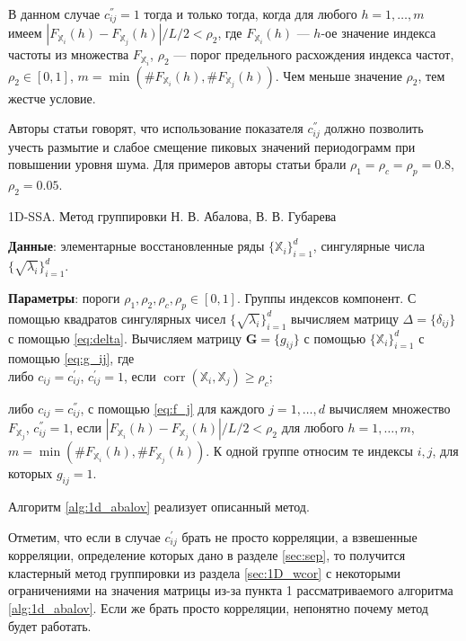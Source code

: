 \documentclass[specialist,
               substylefile = spbu.rtx,
               subf,href,colorlinks=true, 12pt]{disser}
\def\corr{\mathop{\mathrm{corr}}}
\begin{document}
В данном случае $c^{''}_{ij}=1$ тогда и только тогда, когда для любого $h=1,\ldots,m$ имеем $|F_{\mathbb{X}_i}(h) - F_{\mathbb{X}_j}(h)|/ L/2 < \rho_2$, где $F_{\mathbb{X}_i}(h)$ --- $h$-ое значение индекса частоты из множества $F_{\mathbb{X}_i}$, $\rho_2$ --- порог предельного расхождения индекса частот,  $\rho_2 \in [0,1]$, $m = \min\left(\#F_{\mathbb{X}_i}(h), \#F_{\mathbb{X}_j}(h) \right)$. Чем меньше значение $\rho_2$, тем жестче условие.

Авторы статьи говорят, что использование показателя $c^{''}_{ij}$ должно позволить
учесть размытие и слабое смещение пиковых значений периодограмм при повышении уровня шума.
Для примеров авторы статьи брали $\rho_1 =\rho_c =\rho_p = 0.8$, $\rho_2 = 0.05$.

\begin{algorithm}[!hhh]
\caption{1D-SSA. Метод группировки Н. В. Абалова, В. В. Губарева}
\label{alg:1d_abalov}
\begin{algorithmic}[1]
\REQUIRE 
\item \textbf{Данные}: элементарные восстановленные ряды $\{\mathbb{X}_i\}_{i=1}^{d}$, сингулярные числа $\{\sqrt{\lambda_i}\}_{i=1}^{d}$.
\item \textbf{Параметры}: пороги $\rho_1, \rho_2, \rho_c, \rho_p  \in [0,1]$.
\ENSURE Группы индексов компонент.
\STATE  С помощью квадратов сингулярных чисел $\{\sqrt{\lambda_i}\}_{i=1}^{d}$ вычисляем матрицу $\Delta = \{\delta_{ij}\}$ с помощью \eqref{eq:delta}.
\STATE Вычисляем матрицу $\mathbf{G}=\{g_{ij}\}$ с помощью $\{\mathbb{X}_i\}_{i=1}^{d}$ с помощью \eqref{eq:g_ij}, где\\
либо $c_{ij} = c_{ij}^{'}$, $c_{ij}^{'} = 1$, если  $\corr(\mathbb{X}_i, \mathbb{X}_j) \geqslant \rho_c$;

либо $c_{ij} = c_{ij}^{''}$, с помощью \eqref{eq:f_j} для каждого $j = 1,\ldots, d$ вычисляем множество $F_{\mathbb{X}_j}$, $c_{ij}^{''} = 1$, если $|F_{\mathbb{X}_i}(h) - F_{\mathbb{X}_j}(h)|/ L/2 < \rho_2$ для любого $h=1,\ldots,m$, $m = \min\left(\#F_{\mathbb{X}_i}(h), \#F_{\mathbb{X}_j}(h) \right)$.
\STATE К одной группе относим те индексы $i,j$, для которых $g_{ij} = 1$.
\end{algorithmic}
\end{algorithm}

Алгоритм \ref{alg:1d_abalov} реализует описанный метод.

Отметим, что если в случае $c_{ij}^{'}$ брать не просто корреляции, а взвешенные корреляции, определение которых дано в разделе \ref{sec:sep}, то получится кластерный метод группировки из раздела \ref{sec:1D_wcor} с некоторыми ограничениями на значения матрицы из-за пункта 1 рассматриваемого алгоритма \ref{alg:1d_abalov}. Если же брать просто корреляции, непонятно почему метод будет работать.
\end{document}
